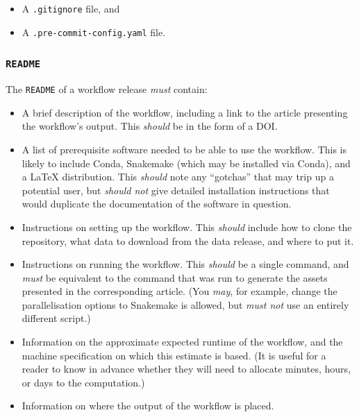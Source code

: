 \documentclass{article}
\newcommand\rfcword[1]{\emph{#1}\xspace}
\newcommand\must{\rfcword{must}}
\newcommand\mustnot{\rfcword{must not}}
\newcommand\should{\rfcword{should}}
\newcommand\shouldnot{\rfcword{should not}}
\newcommand\may{\rfcword{may}}
\newcommand\filename[1]{\texttt{#1}\xspace}
\newcommand\readme{\filename{README}}
\begin{document}
\begin{itemize}
  \item A \filename{.gitignore} file, and
  \item A \filename{.pre-commit-config.yaml} file.
\end{itemize}

\subsubsection{\readme}

The \readme of a workflow release \must contain:

\begin{itemize}
  \item
        A brief description of the workflow,
        including a link to the article presenting the workflow's output.
        This \should be in the form of a DOI\@.
  \item
        A list of prerequisite software needed to be able to use the workflow.
        This is likely to include
        Conda,
        Snakemake
        (which may be installed via Conda),
        and a LaTeX distribution.
        This \should note any ``gotchas'' that may trip up a potential user,
        but \shouldnot give detailed installation instructions
        that would duplicate the documentation of the software in question.
  \item
        Instructions on setting up the workflow.
        This \should include how to clone the repository,
        what data to download from the data release,
        and where to put it.
  \item
        Instructions on running the workflow.
        This \should be a single command,
        and \must be equivalent to the command that was run
        to generate the assets presented in the corresponding article.
        (You \may,
        for example,
        change the parallelisation options to Snakemake is allowed,
        but \mustnot use an entirely different script.)
  \item
        Information on the approximate expected runtime of the workflow,
        and the machine specification on which this estimate is based.
        (It is useful for a reader to know in advance
        whether they will need to allocate
        minutes,
        hours,
        or days
        to the computation.)
  \item
        Information on where the output of the workflow is placed.
\end{itemize}
\end{document}
